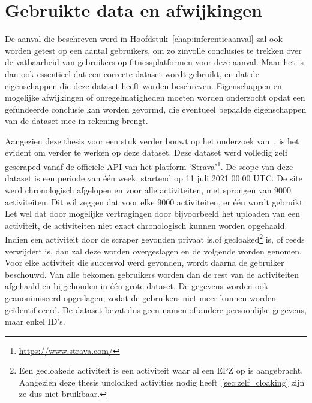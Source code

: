 \chapter{Gebruikte data en afwijkingen}
De aanval die beschreven werd in Hoofdstuk~\ref{chap:inferentieaanval} zal ook
worden getest op een aantal gebruikers, om zo zinvolle conclusies te trekken
over de vatbaarheid van gebruikers op fitnessplatformen voor deze aanval. Maar
het is dan ook essentieel dat een correcte dataset wordt gebruikt, en dat de
eigenschappen die deze dataset heeft worden beschreven. Eigenschappen en
mogelijke afwijkingen of onregelmatigheden moeten worden onderzocht opdat een
gefundeerde conclusie kan worden gevormd, die eventueel bepaalde eigenschappen
van de dataset mee in rekening brengt.

Aangezien deze thesis voor een stuk verder bouwt op het onderzoek
van~\citeauthor{Dhondt_Pochat_Voulimeneas_Joosen_Volckaert_2022}, is het
evident om verder te werken op deze
dataset\cite{Dhondt_Pochat_Voulimeneas_Joosen_Volckaert_2022}. Deze dataset
werd volledig zelf gescraped vanaf de officiële \ac{API} van het platform
`Strava'\footnote{\url{https://www.strava.com/}}. De scope van deze dataset is
een periode van één week, startend op 11 juli 2021 00:00 \ac{UTC}. De site werd
chronologisch afgelopen en voor alle activiteiten, met sprongen van 9000
activiteiten. Dit wil zeggen dat voor elke 9000 activiteiten, er één wordt
gebruikt. Let wel dat door mogelijke vertragingen door bijvoorbeeld het
uploaden van een activiteit, de activiteiten niet exact chronologisch kunnen
worden opgehaald. Indien een activiteit door de scraper gevonden privaat is,of
gecloaked\footnote{Een gecloakede activiteit is een activiteit waar al een EPZ
    op is aangebracht. Aangezien deze thesis uncloaked activities nodig
    heeft~\ref{sec:zelf_cloaking} zijn ze dus niet bruikbaar.} is, of reeds
verwijdert is, dan zal deze worden overgeslagen en de volgende worden genomen.
Voor elke activiteit die succesvol werd gevonden, wordt daarna de gebruiker
beschouwd. Van alle bekomen gebruikers worden dan de rest van de activiteiten
afgehaald en bijgehouden in één grote dataset. De gegevens worden ook
geanonimiseerd opgeslagen, zodat de gebruikers niet meer kunnen worden
geïdentificeerd. De dataset bevat dus geen namen of andere persoonlijke
gegevens, maar enkel ID's.


